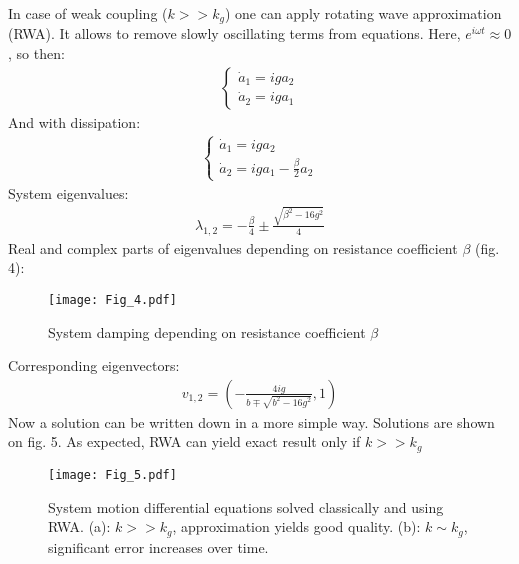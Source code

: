\documentclass[%
aps, pra,
amsmath,amssymb,
reprint,%
superscriptaddress
]{revtex4-2}
\begin{document}
In case of weak coupling ($k>>k_g$) one can apply rotating wave approximation (RWA). It allows to remove slowly oscillating terms from equations. Here, $e^{i\omega t} \approx 0$, so then:
\begin{align*}
	\begin{cases}
		\dot a_1 = iga_2
		\\
		\dot a_2 = iga_1
	\end{cases}
\end{align*}
And with dissipation:
\begin{align*}
	\begin{cases}
		\dot a_1 = iga_2
		\\
		\dot a_2 = iga_1 - \frac{\beta}{2}a_2 
	\end{cases}
\end{align*}
System eigenvalues:
\begin{align*}
	\lambda_{1,2} = -\frac{\beta}{4} \pm \frac{\sqrt{\beta^2-16g^2}}{4}
\end{align*}
Real and complex parts of eigenvalues depending on resistance coefficient $\beta$ (fig. 4):
\begin{figure}[h]
	\centering
	\texttt{[image: Fig\_4.pdf]}
	\caption{System damping depending on resistance coefficient $\beta$}
\end{figure}\newline
Corresponding eigenvectors:
\begin{align*}
		v_{1,2} = \left(-\frac{4ig}{b \mp \sqrt{b^2-16g^2}}, 1	\right)
\end{align*}
Now a solution can be written down in a more simple way. Solutions are shown on fig. 5. As expected, RWA can yield exact result only if $k>>k_g$
\begin{figure}[h]
	\centering
	\texttt{[image: Fig\_5.pdf]}
	\caption{System motion differential equations solved classically and using RWA. (a): {$k>>k_g$}, approximation yields good quality. (b): {$k \sim k_g$}, significant error increases over time.}
\end{figure}
\end{document}
